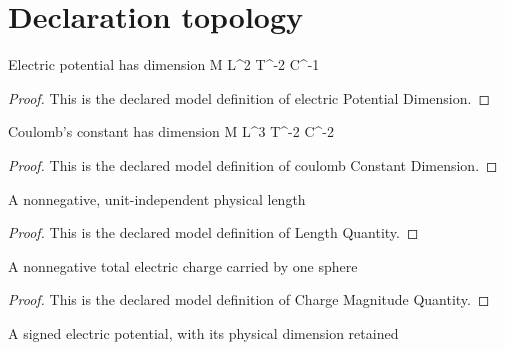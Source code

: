 \section{Declaration topology}
\begin{definition}
  \label{def:physics:phyx-mini-0867:phyxminiproblems-problemphyxmini0867-electricpotentialdimension}
  Electric potential has dimension M L\textasciicircum{}2 T\textasciicircum{}-2 C\textasciicircum{}-1
\end{definition}
\begin{proof}
  This is the declared model definition of electric Potential Dimension.
\end{proof}
\begin{definition}
  \label{def:physics:phyx-mini-0867:phyxminiproblems-problemphyxmini0867-coulombconstantdimension}
  Coulomb's constant has dimension M L\textasciicircum{}3 T\textasciicircum{}-2 C\textasciicircum{}-2
\end{definition}
\begin{proof}
  This is the declared model definition of coulomb Constant Dimension.
\end{proof}
\begin{definition}
  \label{def:physics:phyx-mini-0867:phyxminiproblems-problemphyxmini0867-lengthquantity}
  A nonnegative, unit-independent physical length
\end{definition}
\begin{proof}
  This is the declared model definition of Length Quantity.
\end{proof}
\begin{definition}
  \label{def:physics:phyx-mini-0867:phyxminiproblems-problemphyxmini0867-chargemagnitudequantity}
  A nonnegative total electric charge carried by one sphere
\end{definition}
\begin{proof}
  This is the declared model definition of Charge Magnitude Quantity.
\end{proof}
\begin{definition}
  \label{def:physics:phyx-mini-0867:phyxminiproblems-problemphyxmini0867-electricpotentialquantity}
  A signed electric potential, with its physical dimension retained
\end{definition}
